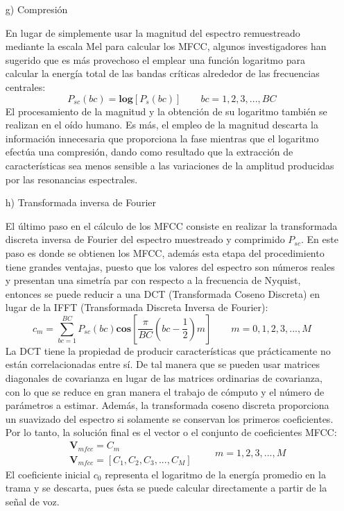\begin{enumerate}
\item[g)]Compresión
\par
En lugar de simplemente usar la magnitud del espectro remuestreado mediante la escala Mel para calcular los MFCC, algunos investigadores han sugerido que es más provechoso el emplear una función logaritmo para calcular la energía total de las bandas críticas alrededor de las frecuencias centrales:
\begin{equation}
\label{eq:ecuacion63}
P_{sc}(bc) = \mathbf{log}[P_{s}(bc)]
\qquad
bc = 1,2,3,...,BC
\end{equation}
El procesamiento de la magnitud y la obtención de su logaritmo también se realizan en el oído humano. Es más, el empleo de la magnitud descarta la información innecesaria que proporciona la fase mientras que el logaritmo efectúa una compresión, dando como resultado que la extracción de características sea menos sensible a las variaciones de la amplitud producidas por las resonancias espectrales.

\item[h)]Transformada inversa de Fourier
\par
El último paso en el cálculo de los MFCC consiste en realizar la transformada discreta inversa de Fourier del espectro muestreado y comprimido $P_{sc}$. En este paso es donde se obtienen los MFCC, además esta etapa del procedimiento tiene grandes ventajas, puesto que los valores del espectro son números reales y presentan una simetría par con respecto a la frecuencia de Nyquist, entonces se puede reducir a una DCT (Transformada Coseno Discreta) en lugar de la IFFT (Transformada Discreta Inversa de Fourier):
\begin{equation}
\label{eq:ecuacion64}
c_{m} = \sum_{bc = 1}^{BC}P_{sc}(bc)\mathbf{cos}\left [ \frac{\pi }{BC}\left ( bc - \frac{1}{2} \right ) m \right ]
\qquad
m = 0,1,2,3,...,M
\end{equation}
La DCT tiene la propiedad de producir características que prácticamente no están correlacionadas entre sí. De tal manera que se pueden usar matrices diagonales de covarianza en lugar de las matrices ordinarias de covarianza, con lo que se reduce en gran manera el trabajo de cómputo y el número de parámetros a estimar. Además, la transformada coseno discreta proporciona un suavizado del espectro si solamente se conservan los primeros coeficientes.
\vskip 0.5cm
Por lo tanto, la solución final es el vector o el conjunto de coeficientes MFCC:
\begin{equation}
\label{eq:ecuacion65}
\begin{aligned}
& \mathbf{V}_{mfcc} = C_{m} \\
& \mathbf{V}_{mfcc} = [C_{1},C_{2},C_{3},...,C_{M}]
\end{aligned}
\qquad
m = 1,2,3,...,M
\end{equation}
El coeficiente inicial $c_{0}$ representa el logaritmo de la energía promedio en la trama y se descarta, pues ésta se puede calcular directamente a partir de la señal de voz.


\end{enumerate}
